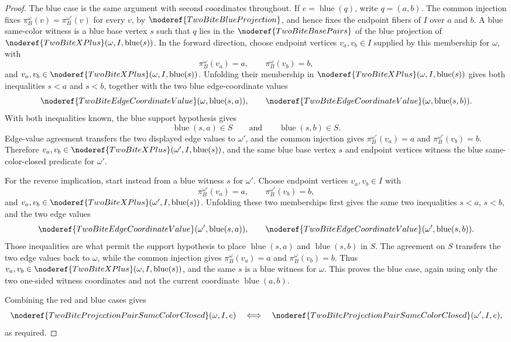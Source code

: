 \begin{proof}
The blue case is the same argument with second coordinates throughout.  If
\(e=\operatorname{blue}(q)\), write \(q=(a,b)\).  The common injection fixes
\(\pi_B^\omega(v)=\pi_B^{\omega'}(v)\) for every \(v\), by
\(\noderef{TwoBiteBlueProjection}\), and hence fixes the endpoint fibers of
\(I\) over \(a\) and \(b\).  A blue same-color witness is a blue base vertex
\(s\) such that \(q\) lies in the
\(\noderef{TwoBiteBasePairs}\) of the blue projection of
\(\noderef{TwoBiteXPlus}(\omega,I,\operatorname{blue}(s))\).  In the forward
direction, choose endpoint vertices \(v_a,v_b\in I\) supplied by this
membership for \(\omega\), with
\[
\pi_B^\omega(v_a)=a,\qquad \pi_B^\omega(v_b)=b,
\]
and \(v_a,v_b\in
\noderef{TwoBiteXPlus}(\omega,I,\operatorname{blue}(s))\).  Unfolding their
membership in
\(\noderef{TwoBiteXPlus}(\omega,I,\operatorname{blue}(s))\) gives both
inequalities \(s<a\) and \(s<b\), together with the two blue edge-coordinate
values
\[
\noderef{TwoBiteEdgeCoordinateValue}(\omega,\operatorname{blue}(s,a)),
\qquad
\noderef{TwoBiteEdgeCoordinateValue}(\omega,\operatorname{blue}(s,b)).
\]
With both inequalities known, the blue support hypothesis gives
\[
\operatorname{blue}(s,a)\in S
\qquad\text{and}\qquad
\operatorname{blue}(s,b)\in S.
\]
Edge-value agreement transfers the two displayed edge values to
\(\omega'\), and the common injection gives
\(\pi_B^{\omega'}(v_a)=a\) and \(\pi_B^{\omega'}(v_b)=b\).  Therefore
\(v_a,v_b\in
\noderef{TwoBiteXPlus}(\omega',I,\operatorname{blue}(s))\), and the same
blue base vertex \(s\) and endpoint vertices witness the blue
same-color-closed predicate for \(\omega'\).

For the reverse implication, start instead from a blue witness \(s\) for
\(\omega'\).  Choose endpoint vertices \(v_a,v_b\in I\) with
\[
\pi_B^{\omega'}(v_a)=a,\qquad \pi_B^{\omega'}(v_b)=b,
\]
and \(v_a,v_b\in
\noderef{TwoBiteXPlus}(\omega',I,\operatorname{blue}(s))\).  Unfolding these
two memberships first gives the same two inequalities \(s<a\), \(s<b\), and
the two edge values
\[
\noderef{TwoBiteEdgeCoordinateValue}(\omega',\operatorname{blue}(s,a)),
\qquad
\noderef{TwoBiteEdgeCoordinateValue}(\omega',\operatorname{blue}(s,b)).
\]
Those inequalities are what permit the support hypothesis to place
\(\operatorname{blue}(s,a)\) and \(\operatorname{blue}(s,b)\) in \(S\).  The
agreement on \(S\) transfers the two edge values back to \(\omega\), while
the common injection gives \(\pi_B^\omega(v_a)=a\) and
\(\pi_B^\omega(v_b)=b\).  Thus \(v_a,v_b\in
\noderef{TwoBiteXPlus}(\omega,I,\operatorname{blue}(s))\), and the same
\(s\) is a blue witness for \(\omega\).  This proves the blue case, again
using only the two one-sided witness coordinates and not the current
coordinate \(\operatorname{blue}(a,b)\).

Combining the red and blue cases gives
\[
\noderef{TwoBiteProjectionPairSameColorClosed}(\omega,I,e)
\quad\Longleftrightarrow\quad
\noderef{TwoBiteProjectionPairSameColorClosed}(\omega',I,e),
\]
as required.
\end{proof}
